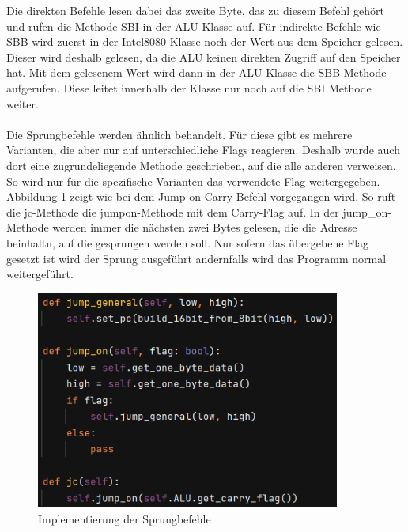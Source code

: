 \documentclass[12pt]{article}
\newcommand{\imgSpaceBefore}{\vspace{10pt}}
\begin{document}
\noindent
Die direkten Befehle lesen dabei das zweite Byte, das zu diesem Befehl gehört und rufen die
Methode SBI in der ALU-Klasse auf. Für indirekte Befehle wie SBB wird zuerst in der Intel8080-Klasse noch der Wert aus dem Speicher gelesen. Dieser wird deshalb gelesen, da die ALU keinen direkten Zugriff auf den Speicher hat. Mit dem gelesenem Wert wird dann in der ALU-Klasse die SBB-Methode aufgerufen. Diese leitet innerhalb der Klasse nur noch auf die SBI Methode weiter.
\\\\
Die Sprungbefehle werden ähnlich behandelt. Für diese gibt es mehrere Varianten, die aber nur auf unterschiedliche Flags reagieren. Deshalb wurde auch dort eine zugrundeliegende Methode geschrieben, auf die alle anderen verweisen. So wird nur für die spezifische Varianten das verwendete Flag weitergegeben.  Abbildung \ref{fig:JumpVariants} zeigt wie bei dem Jump-on-Carry Befehl vorgegangen wird. So ruft die jc-Methode die jump\-on-Methode mit dem Carry-Flag auf. In der jump\_on-Methode werden immer die nächsten zwei Bytes gelesen, die die Adresse beinhaltn, auf die gesprungen werden soll. Nur sofern das übergebene Flag gesetzt ist wird der Sprung ausgeführt andernfalls wird das Programm normal weitergeführt.

\imgSpaceBefore
\begin{figure}[H]
\centering
\includegraphics[width=10cm]{Bilder/JumpVariants}
\caption{Implementierung der Sprungbefehle}
\label{fig:JumpVariants}
\end{figure}
\end{document}
